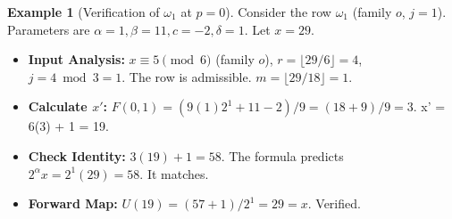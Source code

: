 \documentclass[11pt,letterpaper]{amsart}
\def\mathrm#1{#1}%
\def\[{ }%
\def\]{ }%
\theoremstyle{definition}
\newtheorem{example}{Example}
\theoremstyle{plain}
\theoremstyle{plain}
\theoremstyle{remark}
\begin{document}
\begin{example}[Verification of $\omega_1$ at $p=0$]
Consider the row $\omega_1$ (family $\mathrm{o}$, $j=1$). Parameters are $\alpha=1, \beta=11, c=-2, \delta=1$.
Let $x=29$.
\begin{itemize}
    \item \textbf{Input Analysis:} $x \equiv 5 \pmod 6$ (family $\mathrm{o}$), $r=\lfloor 29/6 \rfloor = 4$, $j = 4 \bmod 3 = 1$. The row is admissible. $m = \lfloor 29/18 \rfloor = 1$.
    \item \textbf{Calculate $x'$:} $F(0,1) = (9(1)2^1 + 11 - 2)/9 = (18+9)/9 = 3$.
    \[ x' = 6(3) + 1 = 19. \]
    \item \textbf{Check Identity:} $3(19)+1 = 58$.
    The formula predicts $2^{\alpha}x = 2^1(29) = 58$. It matches.
    \item \textbf{Forward Map:} $U(19) = (57+1)/2^1 = 29 = x$. Verified.
\end{itemize}
\end{example}
\end{document}

